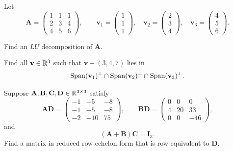 \documentclass[11pt,oneside]{article}
\begin{document}
\begin{problem}
Let
\[
\mathbf A=
\begin{pmatrix}
1&1&1\\
2&3&4\\
4&5&6
\end{pmatrix},
\qquad
\mathbf v_1=\begin{pmatrix}1\\1\\1\end{pmatrix},\quad
\mathbf v_2=\begin{pmatrix}2\\3\\4\end{pmatrix},\quad
\mathbf v_3=\begin{pmatrix}4\\5\\6\end{pmatrix}.
\]
\begin{problemsubparts}
\item Find an $LU$ decomposition of $\mathbf A$.
\item Find all $\mathbf v\in\mathbb{R}^3$ such that $\mathbf v-(3,4,7)$ lies in
\[
\operatorname{Span}(\mathbf v_1)^\perp\cap\operatorname{Span}(\mathbf v_2)^\perp\cap\operatorname{Span}(\mathbf v_3)^\perp.
\]
\end{problemsubparts}
\end{problem}

\begin{problem}
Suppose $\mathbf A,\mathbf B,\mathbf C,\mathbf D\in\mathbb{R}^{3\times3}$ satisfy
\[
\mathbf A\mathbf D=
\begin{pmatrix}
-1&-5&-8\\
-1&-5&-8\\
-2&-10&75
\end{pmatrix},
\qquad
\mathbf B\mathbf D=
\begin{pmatrix}
0&0&0\\
4&20&33\\
0&0&-46
\end{pmatrix},
\]
and
\[
(\mathbf A+\mathbf B)\mathbf C=\mathbf I_3.
\]
Find a matrix in reduced row echelon form that is row equivalent to $\mathbf D$.
\end{problem}
\end{document}

